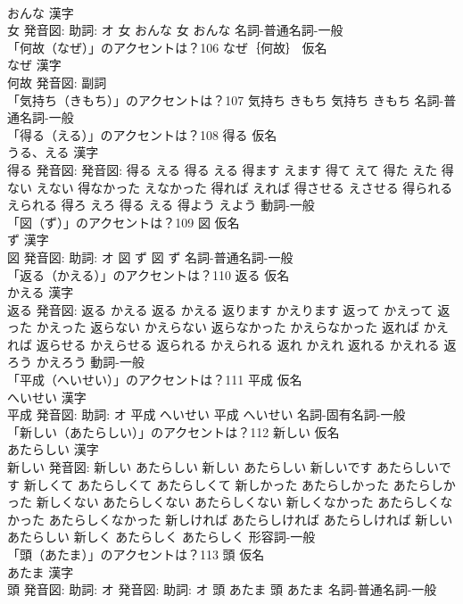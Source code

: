 \documentclass[8pt]{extreport}
\begin{document}
\begin{CJK}{UTF8}{min}
\\	おんな 漢字　
\\	女 発音図: 助詞: オ	女 おんな		女 おんな				名詞-普通名詞-一般 
\\	「何故（なぜ）」のアクセントは？106	なぜ｛何故｝ 仮名　
\\	なぜ 漢字　
\\	何故 発音図:							副詞 
\\	「気持ち（きもち）」のアクセントは？107		気持ち きもち		気持ち きもち				名詞-普通名詞-一般 
\\	「得る（える）」のアクセントは？108	得る 仮名　
\\	うる、える 漢字　
\\	得る 発音図: 発音図:	得る える		得る える 得ます えます 得て えて 得た えた 得ない えない 得なかった えなかった 得れば えれば 得させる えさせる 得られる えられる 得ろ えろ 得る える 得よう えよう				動詞-一般 
\\	「図（ず）」のアクセントは？109	図 仮名　
\\	ず 漢字　
\\	図 発音図: 助詞: オ	図 ず		図 ず				名詞-普通名詞-一般 
\\	「返る（かえる）」のアクセントは？110	返る 仮名　
\\	かえる 漢字　
\\	返る 発音図:	返る かえる		返る かえる 返ります かえります 返って かえって 返った かえった 返らない かえらない 返らなかった かえらなかった 返れば かえれば 返らせる かえらせる 返られる かえられる 返れ かえれ 返れる かえれる 返ろう かえろう				動詞-一般 
\\	「平成（へいせい）」のアクセントは？111	平成 仮名　
\\	へいせい 漢字　
\\	平成 発音図: 助詞: オ	平成 へいせい		平成 へいせい				名詞-固有名詞-一般 
\\	「新しい（あたらしい）」のアクセントは？112	新しい 仮名　
\\	あたらしい 漢字　
\\	新しい 発音図:	新しい あたらしい		新しい あたらしい 新しいです あたらしいです 新しくて あたらしくて あたらしくて 新しかった あたらしかった あたらしかった 新しくない あたらしくない あたらしくない 新しくなかった あたらしくなかった あたらしくなかった 新しければ あたらしければ あたらしければ 新しい あたらしい 新しく あたらしく あたらしく				形容詞-一般 
\\	「頭（あたま）」のアクセントは？113	頭 仮名　
\\	あたま 漢字　
\\	頭 発音図: 助詞: オ 発音図: 助詞: オ	頭 あたま		頭 あたま				名詞-普通名詞-一般 

\end{CJK}
\end{document}
